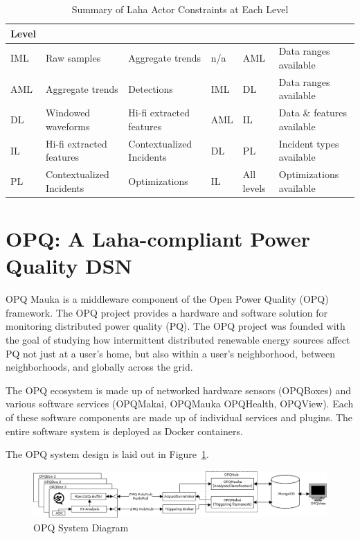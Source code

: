 \begin{table}[h]
	\centering
	\caption{Summary of Laha Actor Constraints at Each Level}
	\begin{tabularx}{\textwidth}{lXXllX}
		\toprule
		\textbf{Level} & \boldmath{$A_i$} & \boldmath{$Ao$} & \boldmath{$A_{ai}$} & \boldmath{$A_{ao}$} & \boldmath{$A_p$} \\
		\midrule
		IML & Raw samples & Aggregate trends & n/a & AML & Data ranges available \\
		AML & Aggregate trends & Detections & IML & DL & Data ranges available \\
		DL & Windowed waveforms & Hi-fi extracted features & AML & IL & Data \& features available \\
		IL & Hi-fi extracted features & Contextualized Incidents & DL & PL & Incident types available \\
		PL & Contextualized Incidents & Optimizations & IL & All levels & Optimizations available \\
		\bottomrule
	\end{tabularx}
	\label{actor-constraint-table}
\end{table}

\section{OPQ: A Laha-compliant Power Quality DSN}\label{sec:opq:-a-laha-compliant-power-quality-dsn}
OPQ Mauka is a middleware component of the Open Power Quality (OPQ) framework. The OPQ project provides a hardware and software solution for monitoring distributed power quality (PQ). The OPQ project was founded with the goal of studying how intermittent distributed renewable energy sources affect PQ not just at a user's home, but also within a user's neighborhood, between neighborhoods, and globally across the grid.

The OPQ ecosystem is made up of networked hardware sensors (OPQBoxes) and various software services (OPQMakai, OPQMauka OPQHealth, OPQView). Each of these software components are made up of individual services and plugins. The entire software system is deployed as Docker containers.

The OPQ system design is laid out in Figure~\ref{fig:opq-system}.

\begin{figure}
	\centering
	\includegraphics[width=\linewidth]{figures/system-diagram.png}
	\caption{OPQ System Diagram}\label{fig:opq-system}
\end{figure}

